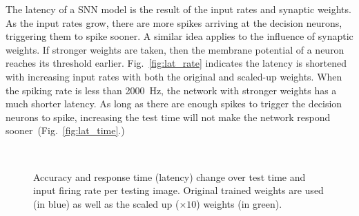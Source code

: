 The latency of a SNN model is the result of the input rates and synaptic weights.
As the input rates grow, there are more spikes arriving at the decision neurons, triggering them to spike sooner.
A similar idea applies to the influence of synaptic weights. If stronger weights are taken, then the membrane potential of a neuron reaches its threshold earlier.
Fig.~\ref{fig:lat_rate} indicates the latency is shortened with increasing input rates with both the original and scaled-up weights.
When the spiking rate is less than 2000~Hz, the network with stronger weights has a much shorter latency.
As long as there are enough spikes to trigger the decision neurons to spike, increasing the test time will not make the network respond sooner~(Fig.~\ref{fig:lat_time}.)
	\begin{figure}[htb!]
	  \centering
	  	  \\
	  \caption{Accuracy and response time (latency) change over test time and input firing rate per testing image. Original trained weights are used (in blue) as well as the scaled up ($\times10$) weights (in green). }
	  \label{fig:assess}
	\end{figure}

